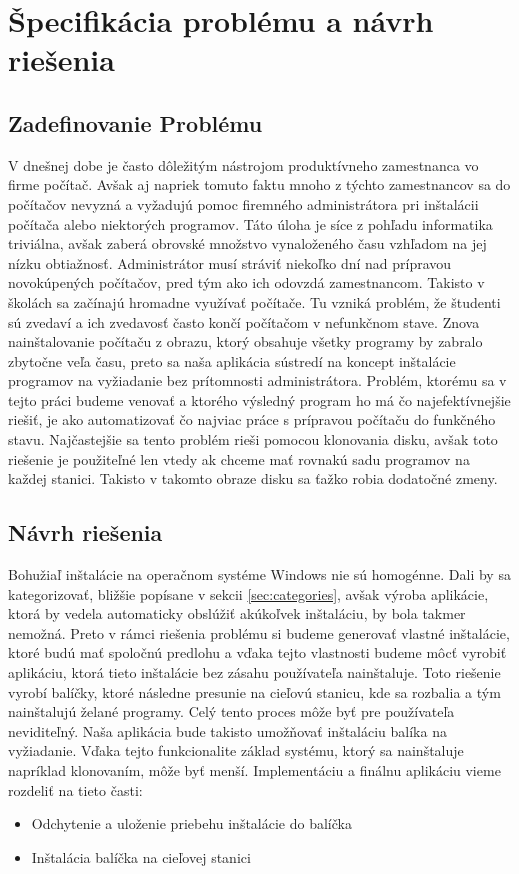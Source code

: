 \chapter{Špecifikácia problému a návrh riešenia}

\section{Zadefinovanie Problému}
V dnešnej dobe je často dôležitým nástrojom produktívneho zamestnanca vo firme počítač. Avšak aj napriek tomuto faktu mnoho z týchto zamestnancov sa do počítačov nevyzná a vyžadujú pomoc firemného administrátora pri inštalácii počítača alebo niektorých programov. Táto úloha je síce z pohľadu informatika triviálna, avšak zaberá obrovské množstvo vynaloženého času vzhľadom na jej nízku obtiažnosť. Administrátor musí stráviť niekoľko dní nad prípravou novokúpených počítačov, pred tým ako ich odovzdá zamestnancom.
Takisto v školách sa začínajú hromadne využívať počítače. Tu vzniká problém, že študenti sú zvedaví a ich zvedavosť často končí počítačom v nefunkčnom stave. Znova nainštalovanie počítaču z obrazu, ktorý obsahuje všetky programy by zabralo zbytočne veľa času, preto sa naša aplikácia sústredí na koncept inštalácie programov na vyžiadanie bez prítomnosti administrátora.
Problém, ktorému sa v tejto práci budeme venovať a ktorého výsledný program ho má čo najefektívnejšie riešiť, je ako automatizovať čo najviac práce s prípravou počítaču do funkčného stavu. Najčastejšie sa tento problém rieši pomocou klonovania disku, avšak toto riešenie je použiteľné len vtedy ak chceme mať rovnakú sadu programov na každej stanici. Takisto v takomto obraze disku sa ťažko robia dodatočné zmeny.

\section{Návrh riešenia}
Bohužiaľ inštalácie na operačnom systéme Windows nie sú homogénne. Dali by sa kategorizovať, bližšie popísane v sekcii \ref{sec:categories}, avšak výroba aplikácie, ktorá by vedela automaticky obslúžiť akúkoľvek inštaláciu, by bola takmer nemožná. Preto v rámci riešenia problému si budeme generovať vlastné inštalácie, ktoré budú mať spoločnú predlohu a vďaka tejto vlastnosti budeme môcť vyrobiť aplikáciu, ktorá tieto inštalácie bez zásahu používateľa nainštaluje.  Toto riešenie vyrobí balíčky, ktoré následne presunie na cieľovú stanicu, kde sa rozbalia a tým nainštalujú želané programy. Celý tento proces môže byť pre používateľa neviditeľný. Naša aplikácia bude takisto umožňovať inštaláciu balíka na vyžiadanie. Vďaka tejto funkcionalite základ systému, ktorý sa nainštaluje napríklad klonovaním, môže byť menší. Implementáciu a finálnu aplikáciu vieme rozdeliť na tieto časti:
\begin{itemize}
\item Odchytenie a uloženie priebehu inštalácie do balíčka
\item Inštalácia balíčka na cieľovej stanici
\end{itemize}
 
